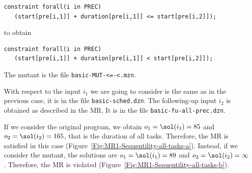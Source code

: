 \begin{lstlisting}
constraint forall(i in PREC)
   (start[pre[i,1]] + duration[pre[i,1]] <= start[pre[i,2]]);
\end{lstlisting}

to obtain
\begin{lstlisting}
constraint forall(i in PREC)
   (start[pre[i,1]] + duration[pre[i,1]] < start[pre[i,2]]);
\end{lstlisting}
The mutant is the file \lstinline|basic-MUT-<=-<.mzn|.

With respect to the input $i_{1}$ we are going to consider is the same as in the
previous case, it is in the file \lstinline|basic-sched.dzn|. The
following-up input $i_{2}$ is obtained as described in the MR.
It is in the file \lstinline{basic-fu-all-prec.dzn}.

If we consider the original program, we obtain $o_{1}=\sol(i_{1})=85$
and $o_{2}=\sol(i_{2})=165$, that is the duration of all
tasks. Therefore, the MR is satisfied in this case (Figure~\ref{Fig:MR1-Sequentility-all-tasks-a}).
Instead, if we consider the mutant, the solutions are
$o_{1}=\sol(i_{1})=89$ and $o_{2}=\sol(i_{2})=\infty$. Therefore, the
MR is violated (Figure~\ref{Fig:MR1-Sequentility-all-tasks-b}).






